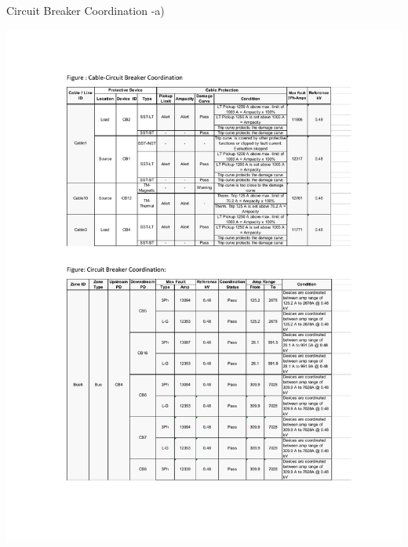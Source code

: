 \begin{table}[]
	\caption{Circuit Breaker Coordination -a)}
	\label{ch04_elecaudit_protectioncoordination03a}
		\includegraphics[width=\textwidth]{tables/ch04_elecaudit_protectioncoordination03a.pdf}	
\end{table}

